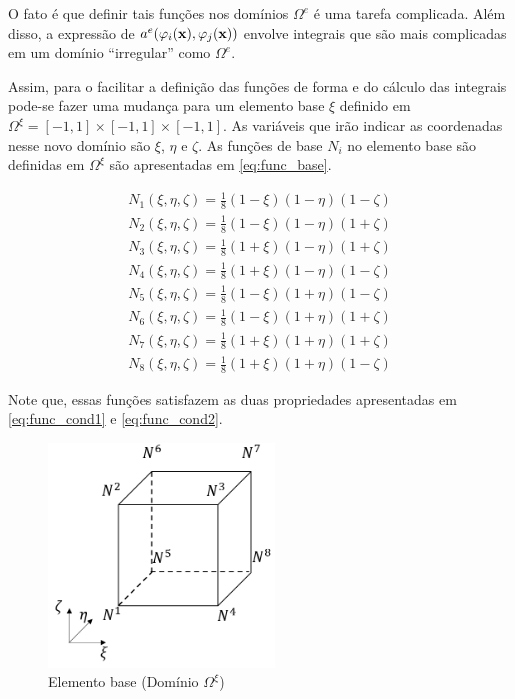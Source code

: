 O fato é que definir tais funções nos domínios $\Omega^e$ é uma tarefa complicada. Além disso, a expressão de $a^e(\varphi_i(\mathbf{x}),\varphi_j(\mathbf{x}))$ envolve integrais que são mais complicadas em um domínio {\color{red}``irregular''} como $\Omega^e$.


Assim, para o facilitar a definição das funções de forma e do cálculo das integrais pode-se fazer uma mudança para um elemento base $\xi$ definido em $\Omega^\xi = [-1,1]\times[-1,1]\times[-1,1]$. As variáveis que irão indicar as coordenadas nesse novo domínio são $\xi$, $\eta$ e $\zeta$. As funções de base $N_i$ no elemento base são definidas em $\Omega^\xi$ são apresentadas em \ref{eq:func_base}.

\begin{equation}
\begin{matrix}\label{eq:func_base}
N_1(\xi, \eta, \zeta) = \frac{1}{8} (1-\xi)(1-\eta)(1-\zeta) \\
N_2(\xi, \eta, \zeta) = \frac{1}{8} (1-\xi)(1-\eta)(1+\zeta) \\
N_3(\xi, \eta, \zeta) = \frac{1}{8} (1+\xi)(1-\eta)(1+\zeta) \\
N_4(\xi, \eta, \zeta) = \frac{1}{8} (1+\xi)(1-\eta)(1-\zeta) \\
N_5(\xi, \eta, \zeta) = \frac{1}{8} (1-\xi)(1+\eta)(1-\zeta) \\
N_6(\xi, \eta, \zeta) = \frac{1}{8} (1-\xi)(1+\eta)(1+\zeta) \\
N_7(\xi, \eta, \zeta) = \frac{1}{8} (1+\xi)(1+\eta)(1+\zeta) \\
N_8(\xi, \eta, \zeta) = \frac{1}{8} (1+\xi)(1+\eta)(1-\zeta)
\end{matrix}
\end{equation}

Note que, essas funções satisfazem as duas propriedades apresentadas em \ref{eq:func_cond1} e \ref{eq:func_cond2}.


\begin{figure}[!htbp]
\label{fig:elemento_base}
\centering
\includegraphics[width=6cm]{chap01/elemento_base.png}
\caption{Elemento base (Domínio $\Omega^\xi$)}
\end{figure}



